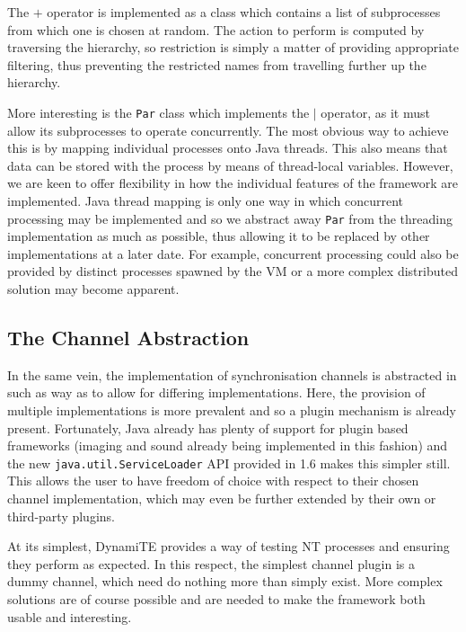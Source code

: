 The $+$ operator is implemented as a class which contains a list of
subprocesses from which one is chosen at random.  The action to perform
is computed by traversing the hierarchy, so restriction is simply a
matter of providing appropriate filtering, thus preventing the
restricted names from travelling further up the hierarchy.

More interesting is the \texttt{Par} class which implements the $\mid$
operator, as it must allow its subprocesses to operate concurrently.
The most obvious way to achieve this is by mapping individual processes
onto Java threads.  This also means that data can be stored with the
process by means of thread-local variables.  However, we are keen to
offer flexibility in how the individual features of the framework are
implemented.  Java thread mapping is only one way in which concurrent
processing may be implemented and so we abstract away \texttt{Par} from
the threading implementation as much as possible, thus allowing it to be
replaced by other implementations at a later date.  For example,
concurrent processing could also be provided by distinct processes
spawned by the VM or a more complex distributed solution may become
apparent.

\subsection{The Channel Abstraction}
\label{dyn:channels}

In the same vein, the implementation of synchronisation channels is
abstracted in such as way as to allow for differing implementations.
Here, the provision of multiple implementations is more prevalent and so
a plugin mechanism is already present.  Fortunately, Java already has
plenty of support for plugin based frameworks (imaging and sound already
being implemented in this fashion) and the new
\texttt{java.util.ServiceLoader} API provided in 1.6 makes this simpler
still.  This allows the user to have freedom of choice with respect to
their chosen channel implementation, which may even be further extended
by their own or third-party plugins.

At its simplest, DynamiTE provides a way of testing NT processes and
ensuring they perform as expected.  In this respect, the simplest
channel plugin is a dummy channel, which need do nothing more than
simply exist.  More complex solutions are of course possible and are
needed to make the framework both usable and interesting.  

